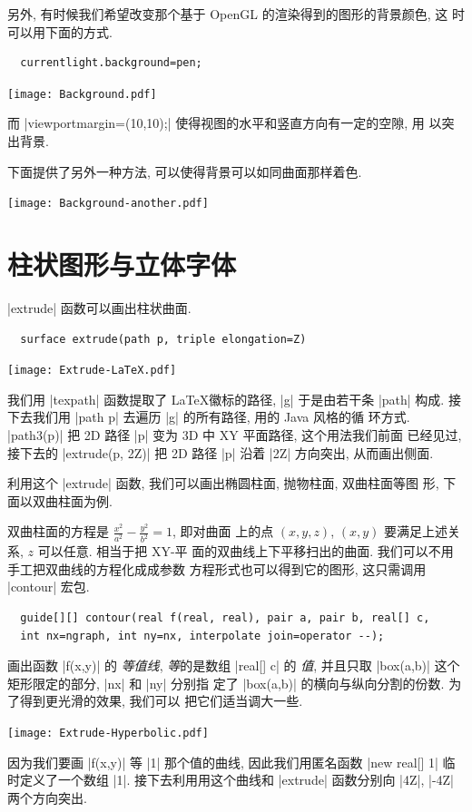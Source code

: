 \documentclass[nofonts,CJKnormalspaces]{ctexbook}
\begin{document}
另外, 有时候我们希望改变那个基于 OpenGL 的渲染得到的图形的背景颜色, 这
时可以用下面的方式.
\begin{lstlisting}
  currentlight.background=pen;
\end{lstlisting}
\begin{center}\texttt{[image: Background.pdf]}\end{center}%

而 |viewportmargin=(10,10);| 使得视图的水平和竖直方向有一定的空隙, 用
以突出背景.

下面提供了另外一种方法, 可以使得背景可以如同曲面那样着色.
\begin{center}\texttt{[image: Background-another.pdf]}\end{center}%


\section{柱状图形与立体字体}
|extrude| 函数可以画出柱状曲面.
\begin{lstlisting}
  surface extrude(path p, triple elongation=Z)
\end{lstlisting}\label{extrude}
\begin{center}\texttt{[image: Extrude-LaTeX.pdf]}\end{center}%

我们用 |texpath| 函数提取了 \LaTeX 徽标的路径, |g| 于是由若干条 |path|
构成. 接下去我们用 |path p| 去遍历 |g| 的所有路径, 用的 Java 风格的循
环方式. |path3(p)| 把 2D 路径 |p| 变为 3D 中 XY 平面路径, 这个用法我们前面
已经见过, 接下去的 |extrude(p, 2Z)| 把 2D 路径 |p| 沿着 |2Z| 方向突出,
从而画出侧面.

利用这个 |extrude| 函数, 我们可以画出椭圆柱面, 抛物柱面, 双曲柱面等图
形, 下面以双曲柱面为例.

双曲柱面的方程是 $\frac{x^{2}}{a^{2}}-\frac{y^{2}}{b^{2}}=1$, 即对曲面
上的点 $(x,y,z)$, $(x,y)$ 要满足上述关系, $z$ 可以任意. 相当于把 XY-平
面的双曲线上下平移扫出的曲面. 我们可以不用手工把双曲线的方程化成成参数
方程形式也可以得到它的图形, 这只需调用 |contour| 宏包.
\begin{lstlisting}
  guide[][] contour(real f(real, real), pair a, pair b, real[] c,
  int nx=ngraph, int ny=nx, interpolate join=operator --);
\end{lstlisting}
画出函数 |f(x,y)| 的 \emph{等值线}, \emph{等}的是数组 |real[] c| 的
\emph{值}, 并且只取 |box(a,b)| 这个矩形限定的部分, |nx| 和 |ny| 分别指
定了 |box(a,b)| 的横向与纵向分割的份数. 为了得到更光滑的效果, 我们可以
把它们适当调大一些.
\begin{center}\texttt{[image: Extrude-Hyperbolic.pdf]}\end{center}%

因为我们要画 |f(x,y)| 等 |1| 那个值的曲线, 因此我们用匿名函数
|new real[] {1}| 临时定义了一个数组 |{1}|. 接下去利用用这个曲线和 |extrude|
函数分别向 |4Z|, |-4Z| 两个方向突出.
\end{document}
